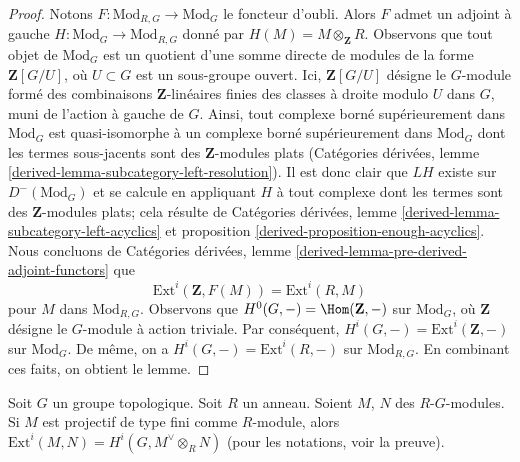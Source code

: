 \begin{proof}
Notons $F : \text{Mod}_{R, G} \to \text{Mod}_G$ le foncteur d'oubli.
Alors $F$ admet un adjoint \`a gauche $H : \text{Mod}_G \to \text{Mod}_{R, G}$
donn\'e par $H(M) = M \otimes_\mathbf{Z} R$. Observons que tout objet de
$\text{Mod}_G$ est un quotient d'une somme directe de modules de la forme
$\mathbf{Z}[G/U]$, o\`u $U \subset G$ est un sous-groupe ouvert.
Ici, $\mathbf{Z}[G/U]$ d\'esigne le $G$-module form\'e des
combinaisons $\mathbf{Z}$-lin\'eaires finies
des classes \`a droite modulo $U$ dans $G$, muni de l'action \`a gauche de $G$.
Ainsi, tout complexe born\'e sup\'erieurement dans $\text{Mod}_G$ est quasi-isomorphe
\`a un complexe born\'e sup\'erieurement dans $\text{Mod}_G$ dont les
termes sous-jacents sont des $\mathbf{Z}$-modules plats
(Cat\'egories d\'eriv\'ees, lemme \ref{derived-lemma-subcategory-left-resolution}).
Il est donc clair que $LH$ existe sur $D^-(\text{Mod}_G)$ et se calcule en
appliquant $H$ \`a tout complexe dont les termes sont des $\mathbf{Z}$-modules plats;
cela r\'esulte de
Cat\'egories d\'eriv\'ees, lemme \ref{derived-lemma-subcategory-left-acyclics} et
proposition \ref{derived-proposition-enough-acyclics}.
Nous concluons de Cat\'egories d\'eriv\'ees, lemme
\ref{derived-lemma-pre-derived-adjoint-functors}
que
$$
\text{Ext}^i(\mathbf{Z}, F(M)) = \text{Ext}^i(R, M)
$$
pour $M$ dans $\text{Mod}_{R, G}$.
Observons que $H^0(G, -) = \Hom(\mathbf{Z}, -)$ sur
$\text{Mod}_G$, o\`u $\mathbf{Z}$ d\'esigne le $G$-module
\`a action triviale. Par cons\'equent,
$H^i(G, -) = \text{Ext}^i(\mathbf{Z}, -)$ sur $\text{Mod}_G$.
De m\^eme, on a $H^i(G, -) = \text{Ext}^i(R, -)$ sur
$\text{Mod}_{R, G}$. En combinant ces faits, on obtient le lemme.
\end{proof}

\begin{lemma}
\label{lemma-ext-modules-hom}
Soit $G$ un groupe topologique. Soit $R$ un anneau.
Soient $M$, $N$ des $R\text{-}G$-modules. Si $M$ est projectif de type fini
comme $R$-module, alors
$\text{Ext}^i(M, N) = H^i(G, M^\vee \otimes_R N)$ (pour les notations,
voir la preuve).
\end{lemma}

